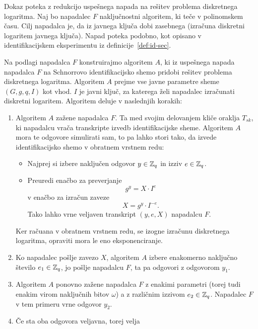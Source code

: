 \begin{dokaz}
    Dokaz poteka z redukcijo uspešnega napada na rešitev problema diskretnega logaritma. Naj bo napadalec
    $F$ naključnostni algoritem, ki teče v polinomskem času. Cilj napadalca je, da iz javnega ključa
    dobi zasebnega (izračuna diskretni logaritem javnega ključa). Napad poteka podobno, kot opisano v
    identifikacijskem eksperimentu iz definicije~\ref{def:id-sec}.

    Na podlagi napadalca $F$ konstruirajmo algoritem $A$, ki iz uspešnega napada napadalca $F$ na
    Schnorrovo identifikacijsko shemo pridobi rešitev problema diskretnega logaritma. Algoritem $A$
    prejme vse javne parametre sheme $(G, g, q, I)$ kot vhod. $I$ je javni ključ, za katerega želi
    napadalec izračunati diskretni logaritem. Algoritem deluje v naslednjih korakih:
    \begin{enumerate}
        \item Algoritem $A$ zažene napadalca $F$. Ta med svojim delovanjem kliče oraklja $T_{sk}$,
            ki napadalcu vrača transkripte izvedb identifikacijske sheme. Algoritem $A$ mora te
            odgovore simulirati sam, to pa lahko stori tako, da izvede identifikacijsko shemo v
            obratnem vrstnem redu:
            \begin{itemize}
                \item Najprej si izbere naključen odgovor $y \in \mathbb Z_q$ in izziv $e \in \mathbb Z_q$.
                \item Preuredi enačbo za preverjanje
                    $$
                    g^y = X \cdot I^e
                    $$
                    v enačbo za izračun zaveze
                    $$
                    X = g^y \cdot I^{-e}.
                    $$
                    Tako lahko vrne veljaven transkript $(y, e, X)$ napadalcu $F$.
            \end{itemize}
            Ker račuana v obratnem vrstnem redu, se izogne izračunu diskretnega logaritma, opraviti
            mora le eno eksponenciranje.
        \item Ko napadalec pošlje zavezo $X$, algoritem $A$ izbere enakomerno naključno število $e_1
            \in \mathbb Z_q$, jo pošlje napadalcu $F$, ta pa odgovori z odgovorom $y_1$.
        \item Algoritem $A$ ponovno zažene napadalca $F$ z enakimi parametri (torej tudi enakim
            virom naključnih bitov $\omega$) a z različnim izzivom $e_2 \in \mathbb Z_q$. Napadalec
            $F$ v tem primeru vrne odgovor $y_2$.
        \item Če sta oba odgovora veljavna, torej velja

\end{enumerate}
\end{dokaz}
